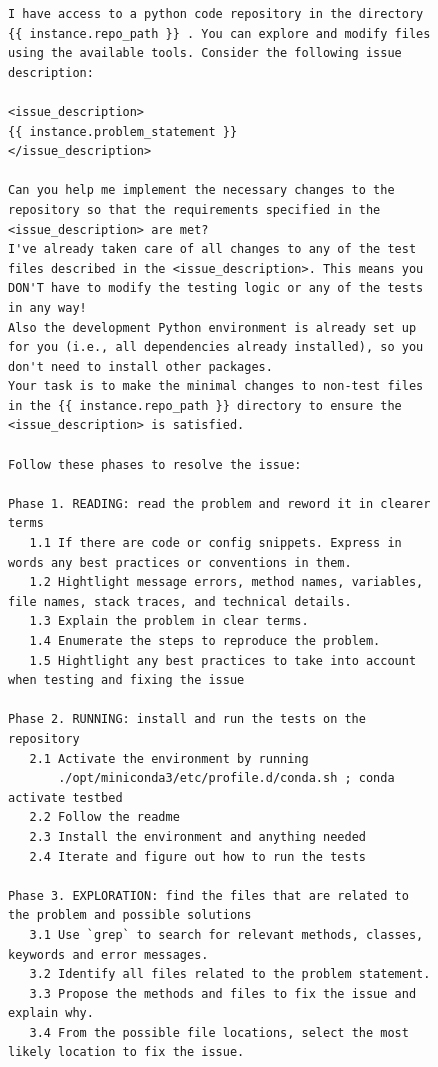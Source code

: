 \begin{figure}[!h]
    \centering
\begin{tcolorbox}[colback=purple!6!white, colframe=purple!75!black, title={\small User Prompt for OpenHands Issue Resolution Agent (Vanilla Setting)}]
\begin{lstlisting}[basicstyle=\fontsize{7.7}{8}\ttfamily]
I have access to a python code repository in the directory {{ instance.repo_path }} . You can explore and modify files using the available tools. Consider the following issue description:

<issue_description>
{{ instance.problem_statement }}
</issue_description>

Can you help me implement the necessary changes to the repository so that the requirements specified in the <issue_description> are met?
I've already taken care of all changes to any of the test files described in the <issue_description>. This means you DON'T have to modify the testing logic or any of the tests in any way!
Also the development Python environment is already set up for you (i.e., all dependencies already installed), so you don't need to install other packages.
Your task is to make the minimal changes to non-test files in the {{ instance.repo_path }} directory to ensure the <issue_description> is satisfied.

Follow these phases to resolve the issue:

Phase 1. READING: read the problem and reword it in clearer terms
   1.1 If there are code or config snippets. Express in words any best practices or conventions in them.
   1.2 Hightlight message errors, method names, variables, file names, stack traces, and technical details.
   1.3 Explain the problem in clear terms.
   1.4 Enumerate the steps to reproduce the problem.
   1.5 Hightlight any best practices to take into account when testing and fixing the issue

Phase 2. RUNNING: install and run the tests on the repository
   2.1 Activate the environment by running  
       ./opt/miniconda3/etc/profile.d/conda.sh ; conda activate testbed
   2.2 Follow the readme
   2.3 Install the environment and anything needed
   2.4 Iterate and figure out how to run the tests

Phase 3. EXPLORATION: find the files that are related to the problem and possible solutions
   3.1 Use `grep` to search for relevant methods, classes, keywords and error messages.
   3.2 Identify all files related to the problem statement.
   3.3 Propose the methods and files to fix the issue and explain why.
   3.4 From the possible file locations, select the most likely location to fix the issue.


\end{lstlisting}
\end{tcolorbox}
\end{figure}
